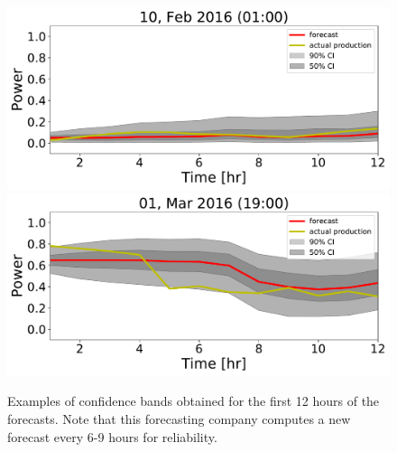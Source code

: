 \documentclass[ima, 25pt, portrait, plainboxedsections]{sciposter}
\begin{document}
\begin{multicols}{3}
\begin{figure}[t]
\begin{center}
   \includegraphics[width=1\linewidth]{confidence_intervals/12hr/75.pdf}
   \includegraphics[width=1\linewidth]{confidence_intervals/12hr/148.pdf}
\end{center}
   \caption{ Examples of confidence bands obtained for the first 12 hours of the forecasts. Note that this forecasting company computes a new forecast every 6-9 hours for reliability.}
\label{fig:6hr}
\end{figure}




\end{multicols}
\end{document}
